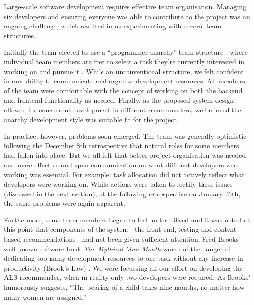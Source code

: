 \documentclass{l3proj}
\begin{document}




Large-scale software development requires effective team organisation. Managing six developers and ensuring everyone was able to contribute to the project was an ongoing challenge, which resulted in us experimenting with several team structures.

Initially the team elected to use a “programmer anarchy” team structure - where individual team members are free to select a task they’re currently interested in working on and pursue it \cite{ProgrammerAnarchy}. While an unconventional structure, we felt confident in our ability to communicate and organise development resources. All members of the team were comfortable with the concept of working on both the backend and frontend functionality as needed. Finally, as the proposed system design allowed for concurrent development in different recommenders, we believed the anarchy development style was suitable fit for the project. 

In practice, however, problems soon emerged. The team was generally optimistic following the December 8th retrospective that natural roles for some members had fallen into place. But we all felt that better project organisation was needed and more effective and open communication on what different developers were working was essential. For example: task allocation did not actively reflect what developers were working on. While actions were taken to rectify these issues (discussed in the next section), at the following retrospective on January 26th, the same problems were again apparent. 

Furthermore, some team members began to feel underutilised and it was noted at this point that components of the system - the front-end, testing and content-based recommendations - had not been given sufficient attention. Fred Brooks' well-known software book \textit{The Mythical Man-Month} warns of the danger of dedicating too many development resources to one task without any increase in productivity (Brook’s Law) \cite{ManMonth}. We were focussing all our effort on developing the ALS recommender, when in reality only two developers were required. As Brooks’ humorously suggests, “The bearing of a child takes nine months, no matter how many women are assigned.”
\end{document}
